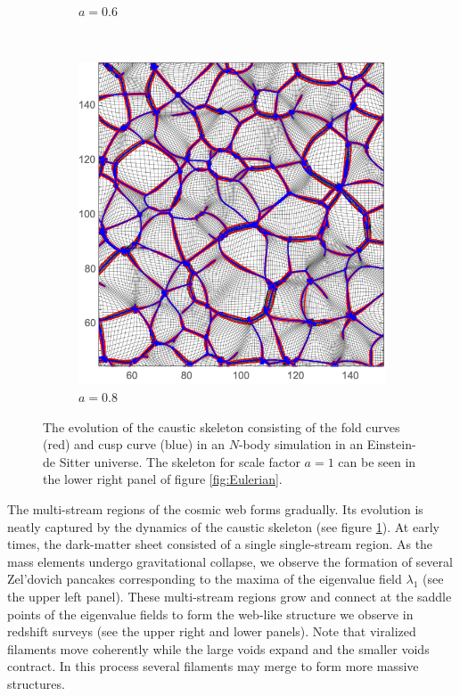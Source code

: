 \documentclass[a4paper, 11pt]{article}
\begin{document}
\begin{figure}
\begin{subfigure}[b]{0.49\textwidth}
\caption{$a=0.6$}
\end{subfigure}~
\begin{subfigure}[b]{0.49\textwidth}
\includegraphics[width=\textwidth]{Evolution_080}
\caption{$a=0.8$}
\end{subfigure}
\caption{The evolution of the caustic skeleton consisting of the fold curves (red) and cusp curve (blue) in an $N$-body simulation in an Einstein-de Sitter universe. The skeleton for scale factor $a=1$ can be seen in the lower right panel of figure \ref{fig:Eulerian}.}\label{fig:Eulerian_Evolution}
\end{figure}

The multi-stream regions of the cosmic web forms gradually. Its evolution is neatly captured by the dynamics of the caustic skeleton (see figure \ref{fig:Eulerian_Evolution}). At early times, the dark-matter sheet consisted of a single single-stream region. As the mass elements undergo gravitational collapse, we observe the formation of several Zel'dovich pancakes corresponding to the maxima of the eigenvalue field $\lambda_1$ (see the upper left panel). These multi-stream regions grow and connect at the saddle points of the eigenvalue fields to form the web-like structure we observe in redshift surveys (see the upper right and lower panels). Note that viralized filaments move coherently while the large voids expand and the smaller voids contract. In this process several filaments may  merge to form more massive structures.
\end{document}
